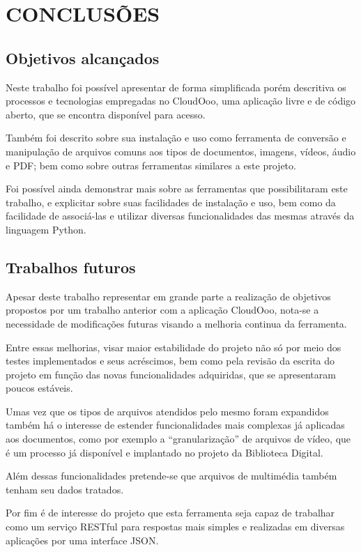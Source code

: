 \chapter{CONCLUSÕES}
\thispagestyle{empty}

\section{Objetivos alcançados}

Neste trabalho foi possível apresentar de forma simplificada porém descritiva os processos e tecnologias empregadas no CloudOoo, uma aplicação livre e de código aberto, que se encontra disponível para acesso.

Também foi descrito sobre sua instalação e uso como ferramenta de conversão e manipulação de arquivos comuns aos tipos de documentos, imagens, vídeos, áudio e PDF; bem como sobre outras ferramentas similares a este projeto.

Foi possível ainda demonstrar mais sobre as ferramentas que possibilitaram este trabalho, e explicitar sobre suas facilidades de instalação e uso, bem como da facilidade de associá-las e utilizar diversas funcionalidades das mesmas através da linguagem Python.


\section{Trabalhos futuros}

Apesar deste trabalho representar em grande parte a realização de objetivos propostos por um trabalho anterior com a aplicação CloudOoo, nota-se a necessidade de modificações futuras visando a melhoria continua da ferramenta.

Entre essas melhorias, visar maior estabilidade do projeto não só por meio dos testes implementados e seus acréscimos, bem como pela revisão da escrita do projeto em função das novas funcionalidades adquiridas, que se apresentaram poucos estáveis.

Umas vez que os tipos de arquivos atendidos pelo mesmo foram expandidos também há o interesse de estender funcionalidades mais complexas já aplicadas aos documentos, como por exemplo a ``granularização'' de arquivos de vídeo, que é um processo já disponível e implantado no projeto da Biblioteca Digital.

Além dessas funcionalidades pretende-se que arquivos de multimédia também tenham seu dados tratados.

Por fim é de interesse do projeto que esta ferramenta seja capaz de trabalhar como um serviço RESTful para respostas mais simples e realizadas em diversas aplicações por uma interface JSON.
